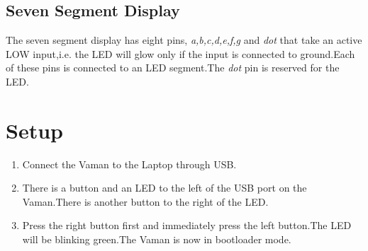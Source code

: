 \documentclass[10pt,a4paper]{article}
\begin{document}
\subsection{Seven Segment Display}
The seven segment display has eight pins, \emph{a,b,c,d,e,f,g} and \emph{dot} that take an active LOW input,i.e. the LED will glow only if the input is connected to ground.Each of these pins is connected to an LED segment.The \emph{dot} pin is reserved for the LED.
\section{Setup}
\begin{enumerate}
\item Connect the Vaman to the Laptop through USB.
\item There is a button and an LED to the left of the USB port on the Vaman.There is another button to the right of the LED.
\item Press the right button first and immediately press the left button.The LED will be blinking green.The Vaman is now in bootloader mode.
\end{enumerate}
\end{document}
